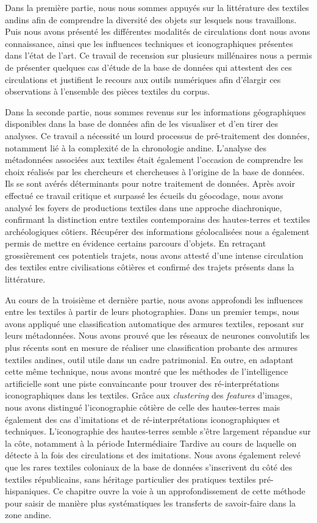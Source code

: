 \documentclass[a4paper, twoside]{book}
\begin{document}
Dans la première partie, nous nous sommes appuyés sur la littérature des textiles andins afin de comprendre la diversité des objets sur lesquels nous travaillons. Puis nous avons présenté les différentes modalités de circulations dont nous avons connaissance, ainsi que les influences techniques et iconographiques présentes dans l'état de l'art. Ce travail de recension sur plusieurs millénaires nous a permis de présenter quelques cas d'étude de la base de données qui attestent des ces circulations et justifient le recours aux outils numériques afin d'élargir ces observations à l'ensemble des pièces textiles du corpus. %

Dans la seconde partie, nous sommes revenus sur les informations géographiques disponibles dans la base de données afin de les visualiser et d'en tirer des analyses. Ce travail a nécessité un lourd processus de pré-traitement des données, notamment lié à la complexité de la chronologie andine. L'analyse des métadonnées associées aux textiles était également l'occasion de comprendre les choix réalisés par les chercheurs et chercheuses à l'origine de la base de données. Ils se sont avérés déterminants pour notre traitement de données. Après avoir effectué ce travail critique et surpassé les écueils du géocodage, nous avons analysé les foyers de productions textiles dans une approche diachronique, confirmant la distinction entre textiles contemporains des hautes-terres et textiles archéologiques côtiers. Récupérer des informations géolocalisées nous a également permis de mettre en évidence certains parcours d'objets. En retraçant grossièrement ces potentiels trajets, nous avons attesté d'une intense circulation des textiles entre civilisations côtières et confirmé des trajets présents dans la littérature. 

Au cours de la troisième et dernière partie, nous avons approfondi les influences entre les textiles à partir de leurs photographies. Dans un premier temps, nous avons appliqué une classification automatique des armures textiles, reposant sur leurs métadonnées. Nous avons prouvé que les réseaux de neurones convolutifs les plus récents sont en mesure de réaliser une classification probante des armures textiles andines, outil utile dans un cadre patrimonial. En outre, en adaptant cette même technique, nous avons montré que les méthodes de l'intelligence artificielle sont une piste convaincante pour trouver des ré-interprétations iconographiques dans les textiles. Grâce aux \textit{clustering} des \textit{features} d'images, nous avons distingué l'iconographie côtière de celle des hautes-terres mais également des cas d'imitations et de ré-interprétations iconographiques et techniques. L'iconographie des hautes-terres semble s'être largement répandue sur la côte, notamment à la période Intermédiaire Tardive au cours de laquelle on détecte à la fois des circulations et des imitations. Nous avons également relevé que les rares textiles coloniaux de la base de données s'inscrivent du côté des textiles républicains, sans héritage particulier des pratiques textiles pré-hispaniques. Ce chapitre ouvre la voie à un approfondissement de cette méthode pour saisir de manière plus systématiques les transferts de savoir-faire dans la zone andine. \\
\end{document}
